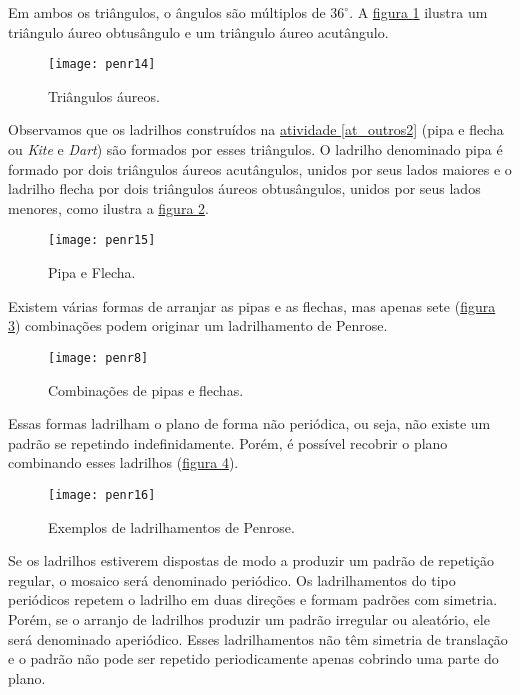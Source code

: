 Em ambos os triângulos, o ângulos são múltiplos de $36^{\circ}$. A \hyperref[penr_14]{figura \ref{penr_14}}  ilustra um  triângulo áureo obtusângulo e um  triângulo áureo acutângulo.

 \begin{figure}[H]
	\centering
	\texttt{[image: penr14]}
	\caption{Triângulos áureos.}
	\label{penr_14}
\end{figure}



Observamos que os ladrilhos construídos na \hyperref[at_outros2]{atividade \ref{at_outros2}} (pipa e flecha ou  \textit{Kite} e \textit{Dart}) são formados por esses triângulos. O ladrilho denominado pipa é formado por dois triângulos áureos acutângulos, unidos por seus lados maiores e o ladrilho flecha por dois triângulos áureos obtusângulos, unidos por seus lados menores, como ilustra a \hyperref[penr_15]{figura \ref{penr_15}}. 

 \begin{figure}[H]
	\centering
	\texttt{[image: penr15]}
	\caption{Pipa e Flecha.}
	\label{penr_15}
\end{figure}


Existem várias formas de arranjar as pipas e as flechas, mas apenas sete (\hyperref[penr_8]{figura \ref{penr_8}}) combinações podem originar um ladrilhamento de  Penrose.

 \begin{figure}[H]
	\centering
	\texttt{[image: penr8]}
	\caption{Combinações de pipas e flechas.}
	\label{penr_8}
\end{figure}



Essas formas  ladrilham o plano de forma não periódica, ou seja, não existe um padrão se repetindo indefinidamente. Porém, é possível recobrir o plano combinando esses ladrilhos (\hyperref[penr_16]{figura \ref{penr_16}}). 

 \begin{figure}[H]
	\centering
	\texttt{[image: penr16]}
	\caption{Exemplos de ladrilhamentos de Penrose.}
	\label{penr_16}
\end{figure}

Se os ladrilhos estiverem dispostas de modo a produzir um padrão de repetição regular, o mosaico será denominado periódico. Os ladrilhamentos do tipo periódicos repetem o ladrilho em duas direções e formam padrões com simetria. Porém, se o arranjo de ladrilhos produzir um padrão irregular ou aleatório, ele será denominado aperiódico. Esses ladrilhamentos não têm simetria de translação e o padrão não pode ser repetido periodicamente apenas cobrindo uma parte do plano.

